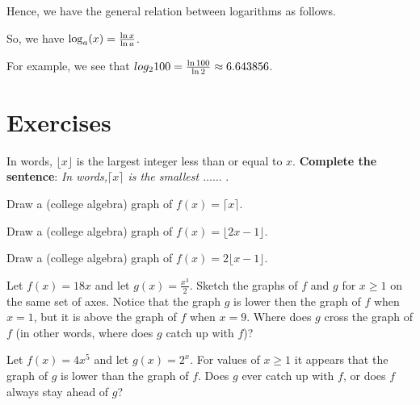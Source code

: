 Hence, we have the general relation between logarithms as follows.
\begin{corollary}
 So, we have $\log_a(x) = {{\ln x}\over{\ln a}}$.
\end{corollary}

\begin{exmp}
 For example, we see that
$log_2 {100} = {{\ln 100}\over{\ln 2}}\approx 6.643856$.
\end{exmp}

\clearpage




\section{Exercises}
\begin{exer}
In words, $\lfloor{x}\rfloor$ is the largest integer less than or equal to $x$. \textbf{Complete the sentence}: 
\emph{In words,$\lceil{x}\rceil$ is the smallest $\dots\dots$} .
\end{exer}

\begin{exer}
Draw a (college algebra) graph of $f(x) = \lceil x \rceil$.
\end{exer}

\begin{exer}
 Draw a (college algebra) graph of $f(x) = \lfloor 2x-1 \rfloor$.

\end{exer}

\begin{exer}
 Draw a (college algebra) graph of $f(x) = 2\lfloor x-1\rfloor$.

\end{exer}

\begin{exer}
 Let $f(x) = 18x$ and let $\displaystyle g(x) = \frac{x^3}{2}$. Sketch the graphs of $f$ and $g$ for $x\geq 1$ on the same set of axes. Notice that the graph $g$ is lower then the graph of $f$ when $x=1$, 
but it is above the graph of $f$ when $x=9$. Where does $g$ cross the graph of $f$ (in other words, where does $g$ catch up with $f$)?

\end{exer}

\begin{exer}
 Let $f(x) = 4x^5$ and let $g(x) = 2^x$. For values of $x\geq 1$ it appears that the graph of $g$ is lower than the graph of $f$.
Does $g$ ever catch up with $f$, or does $f$ always stay ahead of $g$?

\end{exer}

